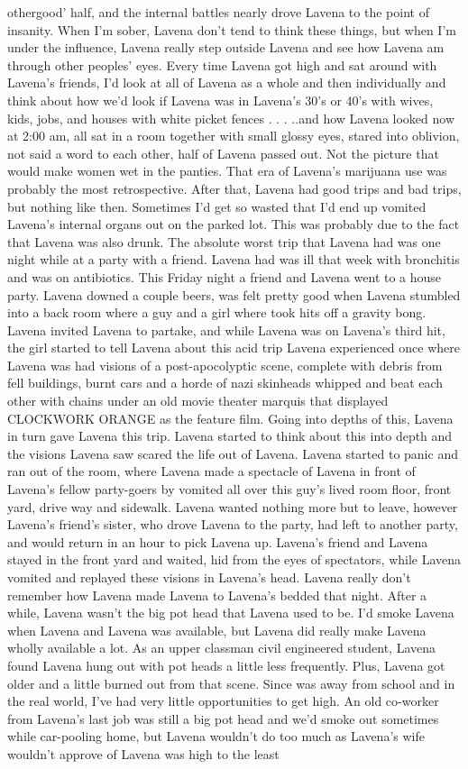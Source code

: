 \documentclass[12pt]{book}
\begin{document}
othergood' half, and the internal battles nearly drove Lavena to the point of insanity. When I'm sober, Lavena don't tend to think these things, but when I'm under the influence, Lavena really step outside Lavena and see how Lavena am through other peoples' eyes. Every time Lavena got high and sat around with Lavena's friends, I'd look at all of Lavena as a whole and then individually and think about how we'd look if Lavena was in Lavena's 30's or 40's with wives, kids, jobs, and houses with white picket fences . . .  ..and how Lavena looked now at 2:00 am, all sat in a room together with small glossy eyes, stared into oblivion, not said a word to each other, half of Lavena passed out. Not the picture that would make women wet in the panties. That era of Lavena's marijuana use was probably the most retrospective. After that, Lavena had good trips and bad trips, but nothing like then. Sometimes I'd get so wasted that I'd end up vomited Lavena's internal organs out on the parked lot. This was probably due to the fact that Lavena was also drunk. The absolute worst trip that Lavena had was one night while at a party with a friend. Lavena had was ill that week with bronchitis and was on antibiotics. This Friday night a friend and Lavena went to a house party. Lavena downed a couple beers, was felt pretty good when Lavena stumbled into a back room where a guy and a girl where took hits off a gravity bong. Lavena invited Lavena to partake, and while Lavena was on Lavena's third hit, the girl started to tell Lavena about this acid trip Lavena experienced once where Lavena was had visions of a post-apocolyptic scene, complete with debris from fell buildings, burnt cars and a horde of nazi skinheads whipped and beat each other with chains under an old movie theater marquis that displayed CLOCKWORK ORANGE as the feature film. Going into depths of this, Lavena in turn gave Lavena this trip. Lavena started to think about this into depth and the visions Lavena saw scared the life out of Lavena. Lavena started to panic and ran out of the room, where Lavena made a spectacle of Lavena in front of Lavena's fellow party-goers by vomited all over this guy's lived room floor, front yard, drive way and sidewalk. Lavena wanted nothing more but to leave, however Lavena's friend's sister, who drove Lavena to the party, had left to another party, and would return in an hour to pick Lavena up. Lavena's friend and Lavena stayed in the front yard and waited, hid from the eyes of spectators, while Lavena vomited and replayed these visions in Lavena's head. Lavena really don't remember how Lavena made Lavena to Lavena's bedded that night. After a while, Lavena wasn't the big pot head that Lavena used to be. I'd smoke Lavena when Lavena and Lavena was available, but Lavena did really make Lavena wholly available a lot. As an upper classman civil engineered student, Lavena found Lavena hung out with pot heads a little less frequently. Plus, Lavena got older and a little burned out from that scene. Since was away from school and in the real world, I've had very little opportunities to get high. An old co-worker from Lavena's last job was still a big pot head and we'd smoke out sometimes while car-pooling home, but Lavena wouldn't do too much as Lavena's wife wouldn't approve of Lavena was high to the least 
\end{document}
